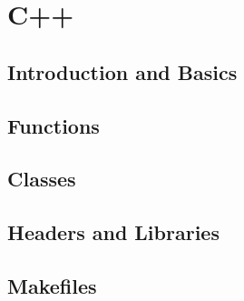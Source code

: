 \part{C++}

\chapter{Introduction and Basics}






\chapter{Functions}






\chapter{Classes}




\chapter{Headers and Libraries}



\chapter{Makefiles}


